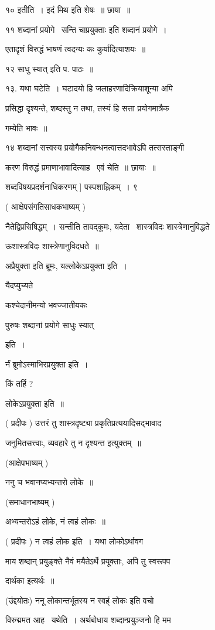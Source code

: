 \documentclass[11pt, openany]{book}
\begin{document}
१० इतीति~। इदं मिथ इति शेषः~॥ छाया~॥ 

११ शब्दानां प्रयोगे \textendash\ {\qt सन्ति चाप्रयुक्ताः} इति शब्दानं प्रयोगे~। 

एतादृशं विरुद्धं भाषणं त्वदन्यः कः कुर्यादित्याशयः~॥ 

१२ {\qt साधु स्यात्} इति प. पाठः~॥ 

१३. यथा घटेति~। घटादयो हि जलाहरणादिक्रियाशून्या अपि 

प्रसिद्धा दृश्यन्ते, शब्दस्तु न तथा, तस्यं हि सत्ता प्रयोगमात्रैक \textendash\ 

गम्येति भावः~॥ 

१४ शब्दानां सत्त्वस्य प्रयोगैकनिबन्धनत्वात्तदभावेऽपि तत्सस्ताङ्गी \textendash\ 

करण विरुद्धं प्रमाणाभावादित्याह \textendash\ एवं चेति~॥ छायाः~॥ 

शब्दविषयप्रदर्शनाधिकरणम् ] पस्पशाह्निकम्~। ९ 

( आक्षेपसंगतिसाधकभाष्यम् ) 

नैतेद्विप्रसिषिद्धम्~। सन्तीति तावद्कूमः, यदेता \textendash\ शास्त्रविदः
शास्त्रेणानुविद्धते 

ऊशास्त्रविदः शास्त्रेणानुविदधते~॥

अप्रैयुक्ता इति ब्रूमः, यल्लोकेऽप्रयुक्ता इति~। 

यैदप्युच्यते \textendash\ {\qt कश्चेदानीमन्यो भवज्जातीयकः 

पुरुषः शब्दानां प्रयोगे साधुः स्यात्} इति~। 

र्नं ब्रूमोऽस्माभिरप्रयुक्ता इति~। 

किं तर्हि ? 

लोकेऽप्रयुक्ता इति~॥ 

( प्रदीपः ) उत्तरं तु शास्त्रदृष्ट्या प्रकृतिप्रत्ययादिसद्भावाद \textendash\ 

जनुमितसत्त्वाः, व्यवहारे तु न दृश्यन्त इत्युक्तम्~॥ 

(आक्षेपभाष्यम् ) 

ननु च भवानप्यभ्यन्तरो लोके~॥ 

(समाधानभाष्यम् ) 

अभ्यन्तरोऽहं लोके, नं त्वहं लोकः~॥ 

( प्रदीपः ) न त्वहं लोक इति~। यथा लोकोऽर्थावग \textendash\ 

माय शब्दान् प्रयुङ्क्ते नैवं मयैतेऽर्थे प्रयूक्ताः, अपि तु स्वरूपप \textendash\ 

दार्थका इत्यर्थः~॥ 

(उंद्दयोतः) {\qt ननू लोकान्तर्भूतस्य न स्वह्ं लोकः} इति वचो 

विरुद्ममत आह \textendash\ यथेति~। अर्थबोधाय शब्दान्प्रयुञ्जनो हि मम 
\end{document}
